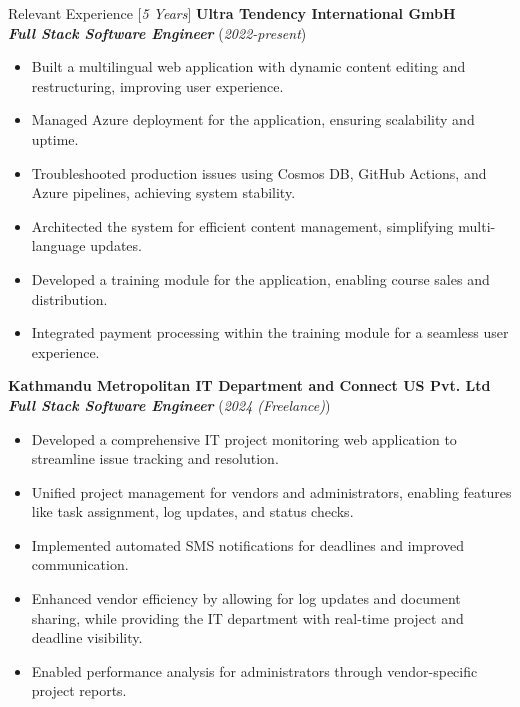 \documentclass{resume} %
\begin{document}
\begin{rSection}{Relevant Experience [\textit{5 Years}]}
    \large{{\bf Ultra Tendency International GmbH}}
    \\ \small{\textit{\textbf{Full Stack Software Engineer}}} (\small{\textit{2022-present}})

    \begin{itemize}
        \item Built a multilingual web application with dynamic content editing and restructuring, improving user experience.
        \item Managed Azure deployment for the application, ensuring scalability and uptime.
        \item Troubleshooted production issues using Cosmos DB, GitHub Actions, and Azure pipelines, achieving system stability.
        \item Architected the system for efficient content management, simplifying multi-language updates.
        \item Developed a training module for the application, enabling course sales and distribution.
        \item Integrated payment processing within the training module for a seamless user experience.
    \end{itemize}

    \pagebreak
    \large{{\bf Kathmandu Metropolitan IT Department and Connect US Pvt. Ltd}}
    \\ \small{\textit{\textbf{Full Stack Software Engineer}}} (\small{\textit{2024 (Freelance)}})

    \begin{itemize}
        \item Developed a comprehensive IT project monitoring web application to streamline issue tracking and resolution.
        \item Unified project management for vendors and administrators, enabling features like task assignment, log updates, and status checks.
        \item Implemented automated SMS notifications for deadlines and improved communication.
        \item Enhanced vendor efficiency by allowing for log updates and document sharing, while providing the IT department with real-time project and deadline visibility.
        \item Enabled performance analysis for administrators through vendor-specific project reports.


\end{itemize}
\end{rSection}
\end{document}
